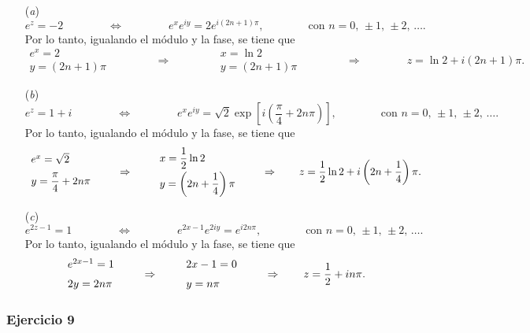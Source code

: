 \documentclass[a4paper]{report}
\begin{document}
\begin{enumerate}
 \item[(\textit{a})] 
 \[
  e^z=-2
  \qquad\qquad\Leftrightarrow\qquad\qquad
  e^xe^{iy}=2e^{i(2n+1)\pi},
  \qquad\qquad\textrm{con }n=0,\,\pm1,\,\pm2,\,\dots.
 \]
 Por lo tanto, igualando el módulo y la fase, se tiene que 
 \[
  \begin{array}{l}
   e^x=2\\
   y=(2n+1)\pi
  \end{array}
  \qquad\qquad\Rightarrow\qquad\qquad
  \begin{array}{l}
   x=\ln 2\\
   y=(2n+1)\pi
  \end{array}
  \qquad\qquad\Rightarrow\qquad\qquad
  z=\ln2+i(2n+1)\pi.
 \]
 \item[(\textit{b})] 
 \[
  e^z=1+i
  \qquad\qquad\Leftrightarrow\qquad\qquad
  e^xe^{iy}=\sqrt{2}\exp\left[i\left(\frac{\pi}{4}+2n\pi\right)\right],
  \qquad\qquad\textrm{con }n=0,\,\pm1,\,\pm2,\,\dots.
 \]
 Por lo tanto, igualando el módulo y la fase, se tiene que 
 \[
  \begin{array}{l}
   e^x=\sqrt{2}\\[\medskipamount]
   y=\dfrac{\pi}{4}+2n\pi
  \end{array}
  \qquad\Rightarrow\qquad
  \begin{array}{l}
   x=\dfrac{1}{2}\ln 2\\[\medskipamount]
   y=\left(2n+\dfrac{1}{4}\right)\pi
  \end{array}
  \qquad\Rightarrow\qquad
  z=\frac{1}{2}\ln2+i\left(2n+\dfrac{1}{4}\right)\pi.
 \]
 \item[(\textit{c})] 
 \[
  e^{2z-1}=1
  \qquad\qquad\Leftrightarrow\qquad\qquad
  e^{2x-1}e^{2iy}=e^{i2n\pi},
  \qquad\qquad\textrm{con }n=0,\,\pm1,\,\pm2,\,\dots.
 \]
 Por lo tanto, igualando el módulo y la fase, se tiene que 
 \[
  \begin{array}{l}
   e^{2x-1}=1\\[\medskipamount]
   2y=2n\pi
  \end{array}
  \qquad\Rightarrow\qquad
  \begin{array}{l}
   2x-1=0\\[\medskipamount]
   y=n\pi
  \end{array}
  \qquad\Rightarrow\qquad
  z=\frac{1}{2}+in\pi.
 \]
\end{enumerate}

\subsubsection{Ejercicio 9}
\end{document}
